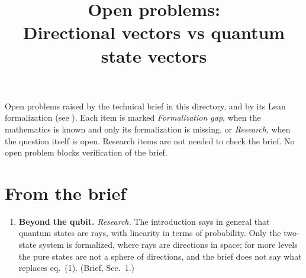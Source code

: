 \documentclass[11pt]{article}
\title{Open problems:\\ Directional vectors vs quantum state vectors}
\author{}
\date{}
\begin{document}
\maketitle

\noindent
Open problems raised by the technical brief in this directory, and by its Lean formalization
(see ). Each item is marked \emph{Formalization gap}, when the mathematics is known and only its
formalization is missing, or \emph{Research}, when the question itself is open.
Research items are not needed to check the brief. No open problem blocks verification of the brief.

\section*{From the brief}
\begin{enumerate}
\item \textbf{Beyond the qubit.} \emph{Research.} The introduction says in general that quantum
  states are rays, with linearity in terms of probability. Only the two-state system is
  formalized, where rays are directions in space; for more levels the pure states are not a
  sphere of directions, and the brief does not say what replaces eq.~(1). (Brief, Sec.~1.)
\end{enumerate}
\end{document}
